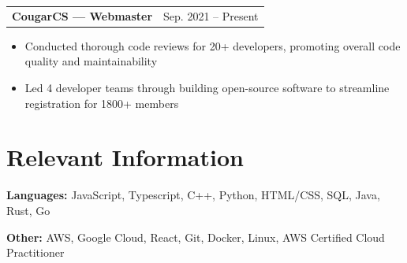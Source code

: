 \documentclass[10pt,letterpaper]{article}
\makeatletter
\newcommand{\resumeHeading}[2]{%
    \noindent
    \begin{tabular*}{\textwidth}
        {@{}l@{\extracolsep{\fill}}r@{}}
        \textbf{#1} & #2
    \end{tabular*}%
}
\newcommand{\resumeBulletsStart}{%
    \begin{itemize}
}
\newcommand{\resumeBulletsEnd}{%
    \end{itemize}
}
\makeatother
\begin{document}
\vspace{5pt}

\resumeHeading
    {CougarCS --- Webmaster}
    {Sep. 2021 -- Present}

\resumeBulletsStart
    \item Conducted thorough code reviews for 20+ developers, promoting overall code quality and maintainability
    \item Led 4 developer teams through building open-source software to streamline registration for 1800+ members
\resumeBulletsEnd


\section{Relevant Information}

\textbf{Languages:} JavaScript, Typescript, C++, Python, HTML/CSS, SQL, Java, Rust, Go

\textbf{Other:} AWS, Google Cloud, React, Git, Docker, Linux, AWS Certified Cloud Practitioner
\end{document}
